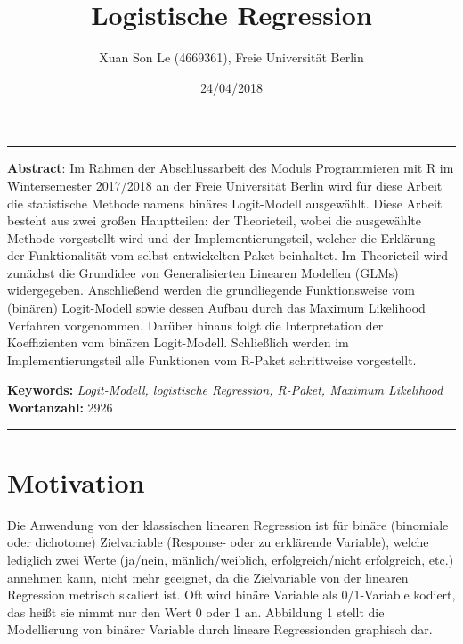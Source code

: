 \documentclass[12pt,]{article}
\title{\textbf{Logistische Regression}}
\author{Xuan Son Le (4669361), Freie Universität Berlin}
\date{24/04/2018}
\begin{document}
\maketitle

\begin{center}\rule{0.5\linewidth}{\linethickness}\end{center}

\textbf{Abstract}: Im Rahmen der Abschlussarbeit des Moduls
Programmieren mit R im Wintersemester 2017/2018 an der Freie Universität
Berlin wird für diese Arbeit die statistische Methode namens binäres
Logit-Modell ausgewählt. Diese Arbeit besteht aus zwei großen
Hauptteilen: der Theorieteil, wobei die ausgewählte Methode vorgestellt
wird und der Implementierungsteil, welcher die Erklärung der
Funktionalität vom selbst entwickelten Paket beinhaltet. Im Theorieteil
wird zunächst die Grundidee von Generalisierten Linearen Modellen (GLMs)
widergegeben. Anschließend werden die grundliegende Funktionsweise vom
(binären) Logit-Modell sowie dessen Aufbau durch das Maximum Likelihood
Verfahren vorgenommen. Darüber hinaus folgt die Interpretation der
Koeffizienten vom binären Logit-Modell. Schließlich werden im
Implementierungsteil alle Funktionen vom R-Paket schrittweise
vorgestellt.

\textbf{Keywords:} \emph{Logit-Modell, logistische Regression, R-Paket,
Maximum Likelihood}\\
\textbf{Wortanzahl:} 2926

\begin{center}\rule{0.5\linewidth}{\linethickness}\end{center}

\newpage

\section{Motivation}\label{motivation}

Die Anwendung von der klassischen linearen Regression ist für binäre
(binomiale oder dichotome) Zielvariable (Response- oder zu erklärende
Variable), welche lediglich zwei Werte (ja/nein, mänlich/weiblich,
erfolgreich/nicht erfolgreich, etc.) annehmen kann, nicht mehr geeignet,
da die Zielvariable von der linearen Regression metrisch skaliert ist.
Oft wird binäre Variable als 0/1-Variable kodiert, das heißt sie nimmt
nur den Wert 0 oder 1 an. Abbildung 1 stellt die Modellierung von
binärer Variable durch lineare Regressionden graphisch dar.
\end{document}
